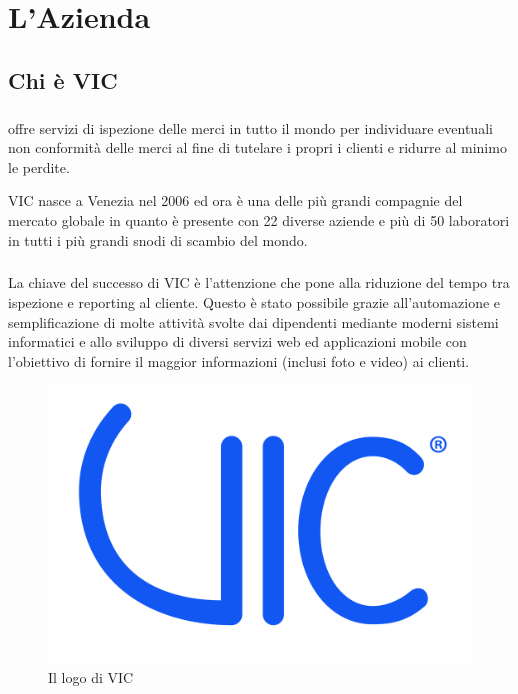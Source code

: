 
\chapter{L'Azienda}
\label{cap:azienda}


\section{Chi è VIC}
	\paragraph{} 
	\vic{} offre servizi di ispezione delle merci in tutto il mondo per individuare eventuali non conformità delle merci 
	al fine di tutelare i propri i clienti e ridurre al minimo le perdite.
	
	VIC nasce a Venezia nel 2006 ed ora è una delle più grandi compagnie del mercato globale in quanto 
	è presente con 22 diverse aziende e più di 50 laboratori in tutti i più grandi snodi di scambio del mondo.
	
	\paragraph{} La chiave del successo di VIC è l'attenzione che pone alla riduzione del tempo tra ispezione e reporting al cliente. 
	Questo è stato possibile grazie all'automazione e semplificazione di molte attività svolte dai dipendenti mediante moderni sistemi
	informatici e allo sviluppo di diversi servizi web ed applicazioni mobile con l’obiettivo di fornire il maggior informazioni (inclusi foto e video) ai clienti.
	
	
	\begin{figure}[ht]
		\centering
		\includegraphics[width=0.5\linewidth]{immagini/logo-vic}
		\caption{Il logo di VIC}
		\label{fig:logo-vic}
	\end{figure}
	 

